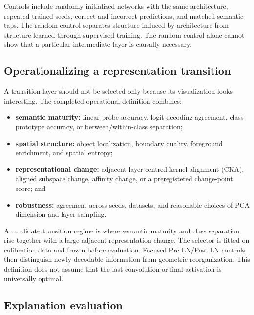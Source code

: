Controls include randomly initialized networks with the same architecture,
repeated trained seeds, correct and incorrect predictions, and matched semantic
taps. The random control separates structure induced by architecture from
structure learned through supervised training. The random control alone cannot
show that a particular intermediate layer is causally necessary.

\subsection{Operationalizing a representation transition}

A transition layer should not be selected only because its visualization looks
interesting. The completed operational definition combines:

\begin{itemize}[leftmargin=*]
    \item \textbf{semantic maturity:} linear-probe accuracy, logit-decoding
    agreement, class-prototype accuracy, or between/within-class separation;
    \item \textbf{spatial structure:} object localization, boundary quality,
    foreground enrichment, and spatial entropy;
    \item \textbf{representational change:} adjacent-layer centred kernel
    alignment (CKA), aligned
    subspace change, affinity change, or a preregistered change-point score; and
    \item \textbf{robustness:} agreement across seeds, datasets, and reasonable
    choices of PCA dimension and layer sampling.
\end{itemize}

A candidate transition regime is where semantic maturity and class
separation rise together with a large adjacent representation change. The
selector is fitted on calibration data and frozen before evaluation. Focused
Pre-LN/Post-LN controls then distinguish newly decodable information from
geometric reorganization. This definition does not assume that the last
convolution or final activation is universally optimal.

\subsection{Explanation evaluation}

